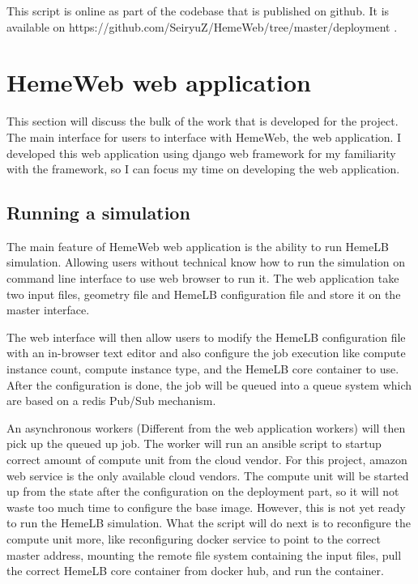 This script is online as part of the codebase that is published on github. It is available on https://github.com/SeiryuZ/HemeWeb/tree/master/deployment .


\section{HemeWeb web application}

This section will discuss the bulk of the work that is developed for the project. The main interface for users to interface with HemeWeb, the web application.  I developed this web application using django web framework for my familiarity with the framework, so I can focus my time on developing the web application.




\subsection{Running a simulation}

The main feature of HemeWeb web application is the ability to run HemeLB simulation. Allowing users without technical know how to run the simulation on command line interface to use web browser to run it. The web application take two input files, geometry file and HemeLB configuration file and store it on the master interface. 

The web interface will then allow users to modify the HemeLB configuration file with an in-browser text editor and also configure the job execution like compute instance count, compute instance type, and the HemeLB core container to use. After the configuration is done, the job will be queued into a queue system which are based on a redis Pub/Sub mechanism. 

An asynchronous workers (Different from the web application workers) will then pick up the queued up job. The worker will run an ansible script to startup correct amount of compute unit from the cloud vendor. For this project, amazon web service is the only available cloud vendors. The compute unit will be started up from the state after the configuration on the deployment part, so it will not waste too much time to configure the base image. However, this is not yet ready to run the HemeLB simulation. What the script will do next is to reconfigure the compute unit more, like reconfiguring docker service to point to the correct master address, mounting the remote file system containing the input files, pull the correct HemeLB core container from docker hub, and run the container.

